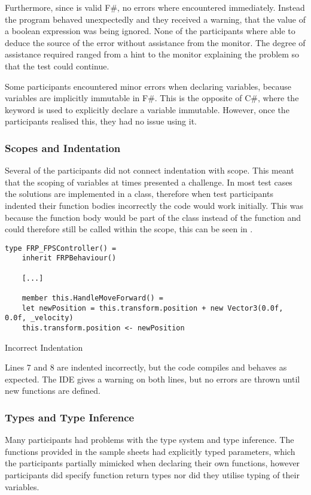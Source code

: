 Furthermore, since  is valid F\#, no errors where encountered immediately. Instead the program behaved unexpectedly and they received a warning, that the value of a boolean expression was being ignored. None of the participants where able to deduce the source of the error without assistance from the monitor. The degree of assistance required ranged from a hint to the monitor explaining the problem so that the test could continue.

Some participants encountered minor errors when declaring variables, because variables are implicitly immutable in F\#. This is the opposite of C\#, where the  keyword is used to explicitly declare a variable immutable. However, once the participants realised this, they had no issue using it.

\subsubsection{Scopes and Indentation}
Several of the participants did not connect indentation with scope. This meant that the scoping of variables at times presented a challenge. In most test cases the solutions are implemented in a class, therefore when test participants indented their function bodies incorrectly the code would work initially. This was because the function body would be part of the class instead of the function and could therefore still be called within the scope, this can be seen in .

\begin{listing}[H]
\begin{verbatim}
type FRP_FPSController() =
    inherit FRPBehaviour()

    [...]

    member this.HandleMoveForward() =
    let newPosition = this.transform.position + new Vector3(0.0f, 0.0f, _velocity)
    this.transform.position <- newPosition
\end{verbatim}
\caption{Incorrect Indentation}
\label{lst:scope-prob}
\end{listing}

Lines 7 and 8 are indented incorrectly, but the code compiles and behaves as expected. The \gls{IDE} gives a warning on both lines, but no errors are thrown until new  functions are defined.

\subsubsection{Types and Type Inference}
Many participants had problems with the type system and type inference. The functions provided in the sample sheets had explicitly typed parameters, which the participants partially mimicked when declaring their own functions, however participants did specify function return types nor did they utilise typing of their variables.

